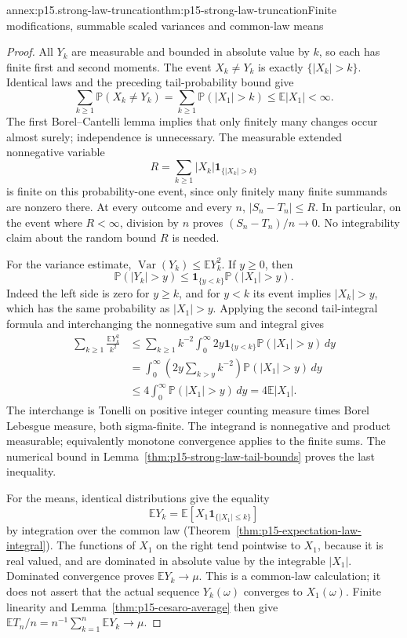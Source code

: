 \begin{annexitem}{annex:p15.strong-law-truncation}{thm:p15-strong-law-truncation}{Finite modifications, summable scaled variances and common-law means}
\begin{proof}
All \(Y_k\) are measurable and bounded in absolute value by \(k\),
so each has finite first and second moments. The event \(X_k\ne Y_k\)
is exactly \(\{|X_k|>k\}\). Identical laws and the preceding
tail-probability bound give
\[
 \sum_{k\geq1}\mathbb P(X_k\ne Y_k)
       =\sum_{k\geq1}\mathbb P(|X_1|>k)
       \leq\mathbb E|X_1|<\infty.
\]
The first Borel--Cantelli lemma implies that only finitely many changes
occur almost surely; independence is unnecessary. The measurable
extended nonnegative variable
\[
 R=\sum_{k\geq1}|X_k|\mathbf1_{\{|X_k|>k\}}
\]
is finite on this probability-one event, since only finitely many
finite summands are nonzero there. At every outcome and every \(n\),
\(|S_n-T_n|\leq R\). In particular, on the event where \(R<\infty\),
division by \(n\) proves \((S_n-T_n)/n\to0\). No integrability
claim about the random bound \(R\) is needed.

For the variance estimate, \(\operatorname{Var}(Y_k)\leq\mathbb EY_k^2\).
If \(y\geq0\), then
\[
 \mathbb P(|Y_k|>y)
   \leq\mathbf1_{\{y<k\}}\mathbb P(|X_1|>y).
\]
Indeed the left side is zero for \(y\geq k\), and for \(y<k\)
its event implies \(|X_k|>y\), which has the same probability
as \(|X_1|>y\). Applying the second tail-integral formula and
interchanging the nonnegative sum and integral gives
\[
 \begin{aligned}
 \sum_{k\geq1}\frac{\mathbb EY_k^2}{k^2}
 &\leq\sum_{k\geq1}k^{-2}
             \int_0^\infty2y\mathbf1_{\{y<k\}}
                                      \mathbb P(|X_1|>y)\,dy\\
 &=\int_0^\infty
       \left(2y\sum_{k>y}k^{-2}\right)\mathbb P(|X_1|>y)\,dy\\
 &\leq4\int_0^\infty\mathbb P(|X_1|>y)\,dy
       =4\mathbb E|X_1|.
 \end{aligned}
\]
The interchange is Tonelli on positive integer counting measure times
Borel Lebesgue measure, both sigma-finite. The integrand is nonnegative
and product measurable; equivalently monotone convergence applies to
the finite sums. The numerical bound in
Lemma~\ref{thm:p15-strong-law-tail-bounds} proves the last inequality.

For the means, identical distributions give the equality
\[
 \mathbb EY_k
     =\mathbb E\!\left[X_1\mathbf1_{\{|X_1|\leq k\}}\right]
\]
by integration over the common law
(Theorem~\ref{thm:p15-expectation-law-integral}). The functions of
\(X_1\) on the right tend pointwise to \(X_1\), because it is
real valued, and are dominated in absolute value by the integrable
\(|X_1|\). Dominated convergence proves \(\mathbb EY_k\to\mu\).
This is a common-law calculation; it does not assert that the actual
sequence \(Y_k(\omega)\) converges to \(X_1(\omega)\).
Finite linearity and Lemma~\ref{thm:p15-cesaro-average} then give
\(\mathbb ET_n/n=n^{-1}\sum_{k=1}^n\mathbb EY_k\to\mu\).


\end{proof}
\end{annexitem}
